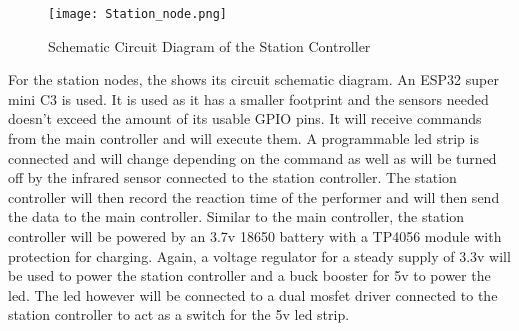 \begin{figure}[h]               
	\centering                    
	\texttt{[image: Station\_node.png]}      
	\caption{Schematic Circuit Diagram of the Station Controller }
	\label{fig:Station_node}
\end{figure}

For the station nodes, the  shows its circuit schematic diagram. An ESP32 super mini C3 is used. It is used as it has a smaller footprint and the sensors needed doesn't exceed the amount of its usable GPIO pins. It will receive commands from the main controller and will execute them. A programmable led strip is connected and will change depending on the command as well as will be turned off by the infrared sensor connected to the station controller. The station controller will then record the reaction time of the performer and will then send the data to the main controller. Similar to the main controller, the station controller will be powered by an 3.7v 18650 battery with a TP4056 module with protection for charging. Again, a voltage regulator for a steady supply of 3.3v will be used to power the station controller and a buck booster for 5v to power the led. The led however will be connected to a dual mosfet driver connected to the station controller to act as a switch for the 5v led strip.
